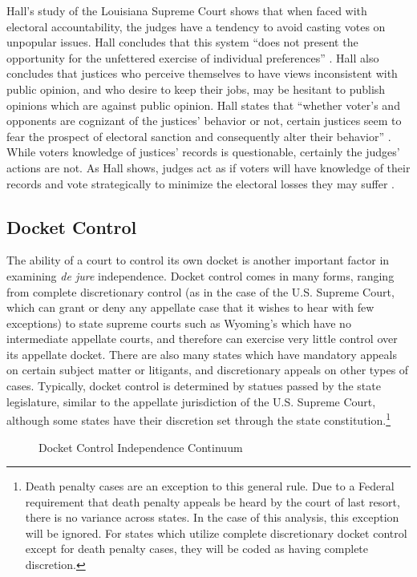 \documentclass[12pt]{article}
\begin{document}
Hall's \citeyearpar{Hall1987a} study of the Louisiana Supreme Court shows that when faced with electoral accountability, the judges have a tendency to avoid casting votes on unpopular issues. Hall concludes that this system ``does not present the opportunity for the unfettered exercise of individual preferences'' \citep[46]{Hall1987a}.  Hall also concludes that justices who perceive themselves to have views inconsistent with public opinion,  and who desire to keep their jobs, may be hesitant to publish opinions which are against public opinion. Hall states that ``whether voter's and opponents are cognizant of the justices’ behavior or not, certain justices seem to fear the prospect of electoral sanction and consequently alter their behavior'' \citep[1123]{Hall1987b}.  While voters knowledge of justices' records is questionable, certainly the judges' actions are not.  As Hall shows, judges act as if voters will have knowledge of their records and vote strategically to minimize the electoral losses they may suffer \citep{Hall1987b}.

\subsection*{Docket Control}
The ability of a court to control its own docket is another important factor in examining \textit{de jure} independence.  Docket control comes in many forms, ranging from complete discretionary control (as in the case of the U.S. Supreme Court, which can grant or deny any appellate case that it wishes to hear with few exceptions) to state supreme courts such as Wyoming's which have no intermediate appellate courts, and therefore can exercise very little control over its appellate docket. There are also many states which have mandatory appeals on certain subject matter or litigants, and discretionary appeals on other types of cases.  Typically, docket control is determined by statues passed by the state legislature, similar to the appellate jurisdiction of the U.S. Supreme Court, although some states have their discretion set through the state constitution.\footnote{Death penalty cases are an exception to this general rule.  Due to a Federal requirement that death penalty appeals be heard by the court of last resort, there is no variance across states.  In the case of this analysis, this exception will be ignored.  For states which utilize complete discretionary docket control except for death penalty cases, they will be coded as having complete discretion.}

\begin{figure}[tbh]\centering\caption{Docket Control Independence Continuum}\label{docketcontinuum}
\end{figure}
\end{document}
